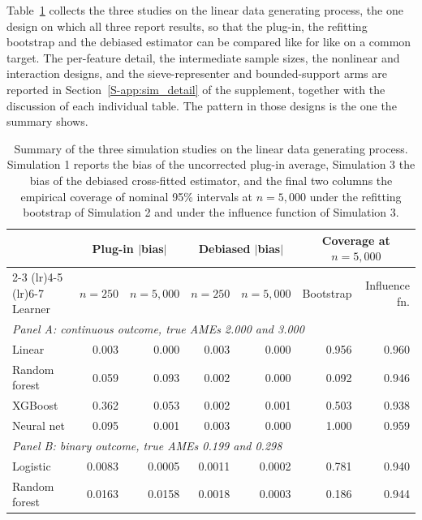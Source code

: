 \documentclass[12pt,a4paper]{article}
\numberwithin{equation}{section}
\theoremstyle{plain}
\theoremstyle{definition}
\begin{document}
	

	Table~\ref{tab:sim_summary} collects the three studies on the linear data
	generating process, the one design on which all three report results, so
	that the plug-in, the refitting bootstrap and the debiased estimator can be
	compared like for like on a common target. The per-feature detail, the
	intermediate sample sizes, the nonlinear and interaction designs, and the
	sieve-representer and bounded-support arms are reported in
	Section~\ref{S-app:sim_detail} of the supplement, together with the
	discussion of each individual table. The pattern in those designs is the one the summary shows.

\begin{table}[htbp]
\centering
\small
\begin{threeparttable}
\caption{Summary of the three simulation studies on the linear data
generating process. Simulation 1 reports the bias of the uncorrected
plug-in average, Simulation 3 the bias of the debiased cross-fitted
estimator, and the final two columns the empirical coverage of nominal
95\% intervals at $n=5{,}000$ under the refitting bootstrap of
Simulation 2 and under the influence function of Simulation 3.}
\label{tab:sim_summary}
\begin{tabular}{lrrrrrr}
\toprule
& \multicolumn{2}{c}{Plug-in $|$bias$|$}
& \multicolumn{2}{c}{Debiased $|$bias$|$}
& \multicolumn{2}{c}{Coverage at $n=5{,}000$} \\
\cmidrule(lr){2-3} \cmidrule(lr){4-5} \cmidrule(lr){6-7}
Learner & $n=250$ & $n=5{,}000$ & $n=250$ & $n=5{,}000$ & Bootstrap & Influence fn. \\
\midrule
\multicolumn{7}{l}{\textit{Panel A: continuous outcome, true AMEs 2.000 and 3.000}} \\
\quad Linear         & 0.003 & 0.000 & 0.003 & 0.000 & 0.956 & 0.960 \\
\quad Random forest  & 0.059 & 0.093 & 0.002 & 0.000 & 0.092 & 0.946 \\
\quad XGBoost        & 0.362 & 0.053 & 0.002 & 0.001 & 0.503 & 0.938 \\
\quad Neural net     & 0.095 & 0.001 & 0.003 & 0.000 & 1.000 & 0.959 \\
\midrule
\multicolumn{7}{l}{\textit{Panel B: binary outcome, true AMEs 0.199 and 0.298}} \\
\quad Logistic       & 0.0083 & 0.0005 & 0.0011 & 0.0002 & 0.781 & 0.940 \\
\quad Random forest  & 0.0163 & 0.0158 & 0.0018 & 0.0003 & 0.186 & 0.944 \\

\end{tabular}
\end{threeparttable}
\end{table}
\end{document}
